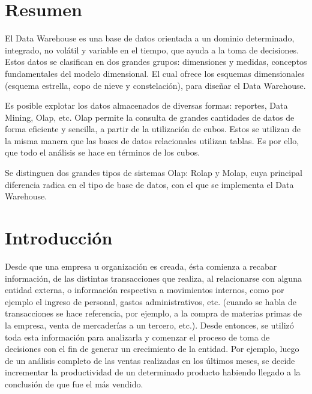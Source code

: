 \documentclass[a4paper,11pt]{article}
\begin{document}
  
  \newpage\null\thispagestyle{empty}\newpage
  \maketitle
  \tableofcontents
  \newpage
  

    \section{Resumen}
  
    El Data Warehouse es una base de datos orientada a un dominio determinado, integrado, no volátil y variable en el tiempo, que ayuda a la toma de decisiones.
    Estos datos se clasifican en dos grandes grupos: dimensiones y medidas, conceptos fundamentales del modelo dimensional. El cual ofrece los esquemas dimensionales
    (esquema estrella, copo de nieve y constelación), para diseñar el Data Warehouse.
    
    Es posible explotar los datos almacenados de diversas formas:
    reportes, Data Mining, Olap, etc. Olap permite la consulta de grandes cantidades de datos de forma eficiente y sencilla, a partir de la utilización de cubos.
    Estos se utilizan de la misma manera que las bases de datos relacionales utilizan tablas.
    Es por ello, que todo el análisis se hace en términos de los cubos.
    
    Se distinguen dos grandes tipos de sistemas Olap: Rolap y Molap, cuya principal diferencia radica en el tipo de base de datos, con el que se implementa el
    Data Warehouse.

  
  
    \section{Introducción}

    Desde que una empresa u organización es creada, ésta comienza a recabar información, de las distintas transacciones que realiza, al relacionarse
    con alguna entidad externa, o información respectiva a movimientos internos, como por ejemplo el ingreso de personal, gastos administrativos,
    etc. (cuando se habla de transacciones se hace referencia, por ejemplo, a la compra de materias primas de la empresa, venta de mercaderías a un tercero,
    etc.). Desde entonces, se utilizó toda esta información para analizarla y comenzar el proceso de toma de decisiones con el fin de generar un
    crecimiento de la entidad. Por ejemplo, luego de un análisis completo de las ventas realizadas en los últimos meses, se decide incrementar la 
    productividad de un determinado producto habiendo llegado a la conclusión de que fue el más vendido.
    
\end{document}
